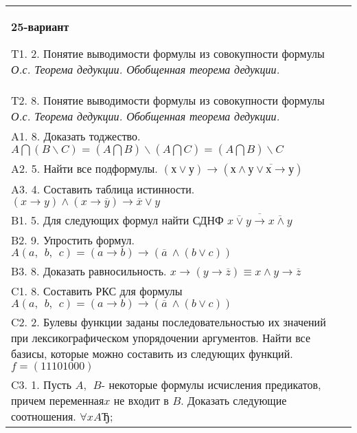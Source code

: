 \documentclass{article}
\begin{document}
\begin{tabular}{m{17cm}}
\textbf{25-вариант}
\newline

T1. 2. Понятие выводимости формулы из совокупности формулы \emph{О.с. Теорема дедукции. Обобщенная теорема дедукции.} \\
T2. 8. Понятие выводимости формулы из совокупности формулы \emph{О.с. Теорема дедукции. Обобщенная теорема дедукции.} \\
A1. 8. Доказать тоджество. \(A\bigcap(B\backslash C) = (A\bigcap B)\backslash(A\bigcap C) = (A\bigcap B)\backslash C\) \\
A2. 5. Найти все подформулы. \((х \vee у) \rightarrow \left( х \land \overline{у \vee х \rightarrow у} \right)\) \\
A3. 4. Составить таблица истинности. \((x \rightarrow y) \land (x \rightarrow \overline{y}) \rightarrow \overline{x} \vee y\) \\
B1. 5. Для следующих формул найти СДНФ \(\overline{\overline{x \vee y} \rightarrow \overline{x \land y}}\) \\
B2. 9. Упростить формул. \(A(a,\ \ b,\ \ c) = (a \rightarrow b) \rightarrow (\overline{a}\  \land (b \vee c))\) \\
B3. 8. Доказать равносильность. \(x \rightarrow \left( y \rightarrow \overline{z} \right) \equiv x \land y \rightarrow \overline{z}\) \\
C1. 8. Составить РКС для формулы \(A(a,\ \ b,\ \ c) = (a \rightarrow b) \rightarrow (\overline{a}\  \land (b \vee c))\) \\
C2. 2. Булевы функции заданы последовательностью их значений при лексикографическом упорядочении аргументов. Найти все базисы, которые можно составить из следующих функций. \(f = (11101000)\) \\
C3. 1. Пусть \(A,\ \ B\)- некоторые формулы исчисления предикатов, причем переменная\(x\) не входит в \(B\). Доказать следующие соотношения. \(\forall xAЂ\); \\

\end{tabular}
\vspace{1cm}
\end{document}

